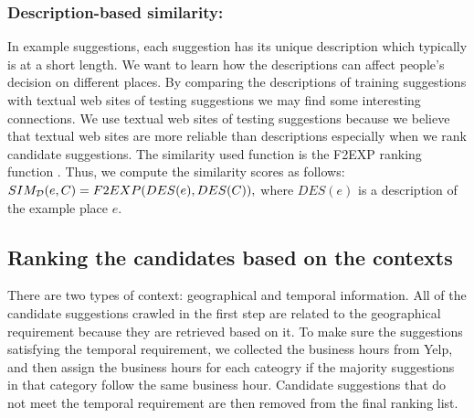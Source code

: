 \subsubsection{Description-based similarity:}
In example suggestions, each suggestion has its unique 
description which typically is at a short length. We want 
to learn how the descriptions can affect people's decision 
on different places. By comparing the descriptions of training 
suggestions with textual web sites of testing suggestions we 
may find some interesting connections. We use textual web sites 
of testing suggestions because we believe that textual web sites 
are more reliable than descriptions especially when we rank 
candidate suggestions. The similarity used function is 
the F2EXP ranking function \cite{Fang:2005:EAA:1076034.1076116}. 
Thus, we compute the similarity scores as follows: 
$SIM_{\cal D}(e,C) = F2EXP(DES(e),DES(C)),$
where $DES(e)$ is a description of the example place $e$. 


\subsection{Ranking the candidates based on the contexts}
There are two types of context: geographical and temporal information. 
All of the candidate suggestions crawled in the first step are related
to the geographical requirement because they are retrieved based on it. 
To make sure the suggestions satisfying the temporal requirement, 
we collected the business hours from Yelp, and then assign the business
hours for each cateogry  
if the majority suggestions in that category follow the same 
business hour. Candidate suggestions that do not meet the temporal 
requirement are then removed from the final ranking list. 




